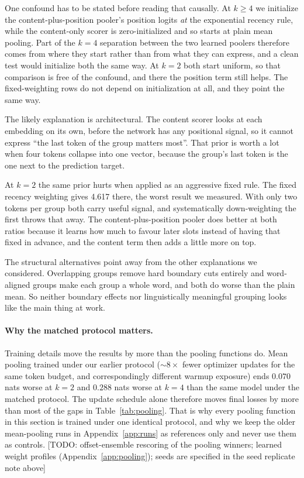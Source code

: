 \documentclass[11pt]{article}
\newcommand{\todo}[1]{\textcolor{warnred}{[TODO: #1]}}
\begin{document}
One confound has to be stated before reading that causally. At $k \geq 4$ we
initialize the content-plus-position pooler's position logits \emph{at} the
exponential recency rule, while the content-only scorer is zero-initialized and
so starts at plain mean pooling. Part of the $k{=}4$ separation between the two
learned poolers therefore comes from where they start rather than from what
they can express, and a clean test would initialize both the same way. At
$k{=}2$ both start uniform, so that comparison is free of the confound, and
there the position term still helps. The fixed-weighting rows do not depend on
initialization at all, and they point the same way.

The likely explanation is architectural. The content scorer looks at each
embedding on its own, before the network has any positional signal, so it
cannot express ``the last token of the group matters most''. That prior is
worth a lot when four tokens collapse into one vector, because the group's last
token is the one next to the prediction target.

At $k{=}2$ the same prior hurts when applied as an aggressive fixed rule. The
fixed recency weighting gives 4.617 there, the worst result we measured. With
only two tokens per group both carry useful signal, and systematically
down-weighting the first throws that away. The content-plus-position pooler
does better at both ratios because it learns how much to favour later slots
instead of having that fixed in advance, and the content term then adds a
little more on top.

The structural alternatives point away from the other explanations we
considered. Overlapping groups remove hard boundary cuts entirely and
word-aligned groups make each group a whole word, and both do worse than the
plain mean. So neither boundary effects nor linguistically meaningful grouping
looks like the main thing at work.

\paragraph{Why the matched protocol matters.}
Training details move the results by more than the pooling functions do. Mean
pooling trained under our earlier protocol (${\sim}8\times$ fewer optimizer
updates for the same token budget, and correspondingly different warmup
exposure) ends $0.070$ nats worse at $k{=}2$ and $0.288$ nats worse at $k{=}4$
than the same model under the matched protocol. The update schedule alone
therefore moves final losses by more than most of the gaps in
Table~\ref{tab:pooling}. That is why every pooling function in this section is
trained under one identical protocol, and why we keep the older mean-pooling
runs in Appendix~\ref{app:runs} as references only and never use them as
controls.
\todo{offset-ensemble rescoring of the pooling winners; learned weight
profiles (Appendix~\ref{app:pooling}); seeds are specified in the seed
replicate note above}
\end{document}
